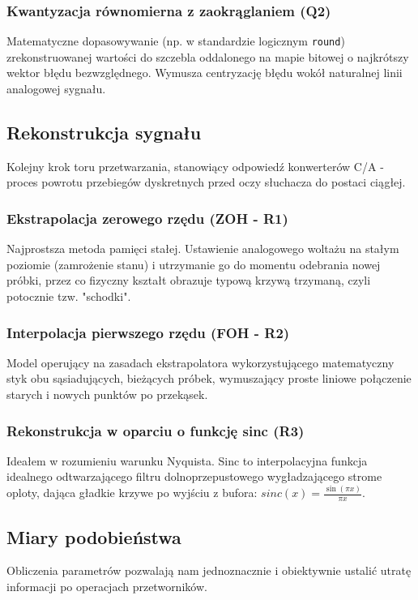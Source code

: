 \documentclass[12pt]{article}
\begin{document}
\subsubsection*{Kwantyzacja równomierna z zaokrąglaniem (Q2)}
Matematyczne dopasowywanie (np. w standardzie logicznym \texttt{round}) zrekonstruowanej wartości do szczebla oddalonego na mapie bitowej o najkrótszy wektor błędu bezwzględnego. Wymusza centryzację błędu wokół naturalnej linii analogowej sygnału.

\subsection{Rekonstrukcja sygnału}
Kolejny krok toru przetwarzania, stanowiący odpowiedź konwerterów C/A - proces powrotu przebiegów dyskretnych przed oczy słuchacza do postaci ciągłej.

\subsubsection*{Ekstrapolacja zerowego rzędu (ZOH - R1)}
Najprostsza metoda pamięci stałej. Ustawienie analogowego woltażu na stałym poziomie (zamrożenie stanu) i utrzymanie go do momentu odebrania nowej próbki, przez co fizyczny kształt obrazuje typową krzywą trzymaną, czyli potocznie tzw. "schodki".

\subsubsection*{Interpolacja pierwszego rzędu (FOH - R2)}
Model operujący na zasadach ekstrapolatora wykorzystującego matematyczny styk obu sąsiadujących, bieżących próbek, wymuszający proste liniowe połączenie starych i nowych punktów po przekąsek.

\subsubsection*{Rekonstrukcja w oparciu o funkcję sinc (R3)}
Ideałem w rozumieniu warunku Nyquista. Sinc to interpolacyjna funkcja idealnego odtwarzającego filtru dolnoprzepustowego wygładzającego strome oploty, dająca gładkie krzywe po wyjściu z bufora: $sinc(x) = \frac{\sin(\pi x)}{\pi x}$.

\subsection{Miary podobieństwa}
Obliczenia parametrów pozwalają nam jednoznacznie i obiektywnie ustalić utratę informacji po operacjach przetworników.
\end{document}
